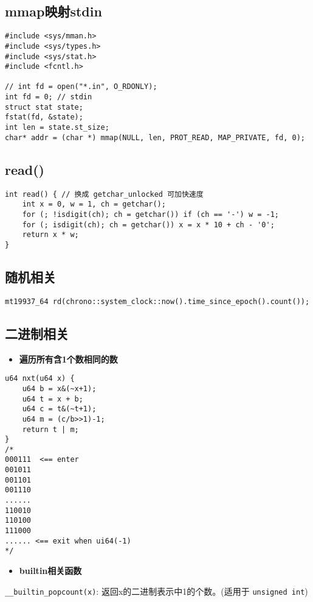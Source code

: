 \documentclass[a4paper,landscape,twocolumn]{ctexart}
\newcommand{\point}[1]{
	\begin{itemize}
		\item \textbf{#1}
	\end{itemize}
}
\begin{document}
\subsection{mmap映射stdin}

\begin{lstlisting}
#include <sys/mman.h>
#include <sys/types.h>
#include <sys/stat.h>
#include <fcntl.h>

// int fd = open("*.in", O_RDONLY);
int fd = 0; // stdin
struct stat state;
fstat(fd, &state);
int len = state.st_size;
char* addr = (char *) mmap(NULL, len, PROT_READ, MAP_PRIVATE, fd, 0);
\end{lstlisting}

\subsection{read()}

\begin{lstlisting}
int read() { // 换成 getchar_unlocked 可加快速度
	int x = 0, w = 1, ch = getchar();
	for (; !isdigit(ch); ch = getchar()) if (ch == '-') w = -1;
	for (; isdigit(ch); ch = getchar()) x = x * 10 + ch - '0';
	return x * w;
}
\end{lstlisting}

\subsection{随机相关}

\begin{lstlisting}
mt19937_64 rd(chrono::system_clock::now().time_since_epoch().count());
\end{lstlisting}

\subsection{二进制相关}

\point{遍历所有含1个数相同的数}

\begin{lstlisting}
u64 nxt(u64 x) {
	u64 b = x&(~x+1);
	u64 t = x + b;
	u64 c = t&(~t+1);
	u64 m = (c/b>>1)-1;
	return t | m;
}
/*
000111  <== enter
001011
001101
001110
......
110010
110100
111000
...... <== exit when ui64(-1)
*/
\end{lstlisting}

\point{builtin相关函数}

\texttt{\_\_builtin\_popcount(x)}: 返回x的二进制表示中1的个数。(适用于 \texttt{unsigned int})
\end{document}
